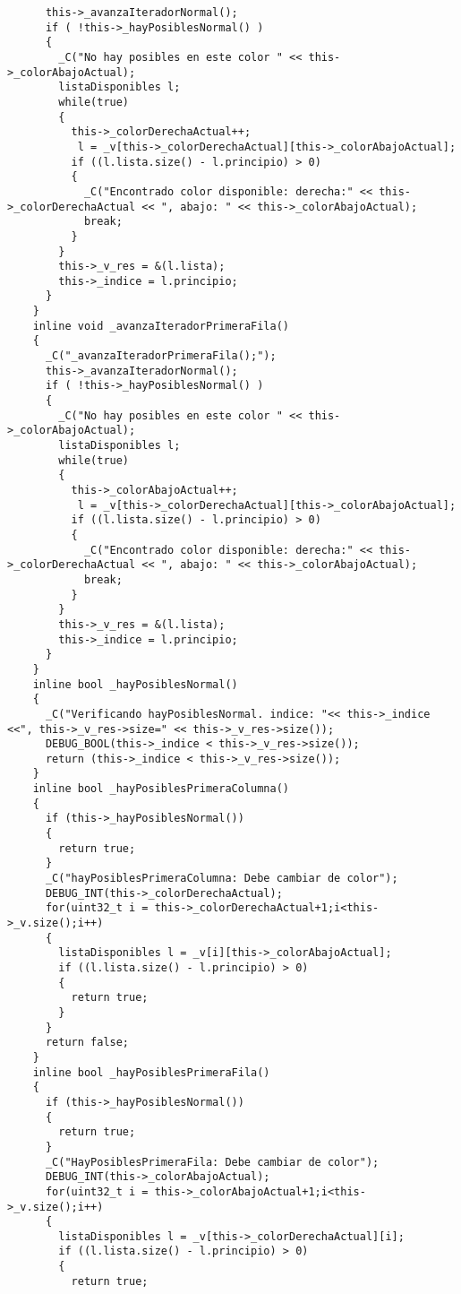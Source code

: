 \documentclass[11pt, a4paper, twoside]{article}
\begin{document}
\begin{lstlisting}
      this->_avanzaIteradorNormal();
      if ( !this->_hayPosiblesNormal() )
      {
        _C("No hay posibles en este color " << this->_colorAbajoActual);
        listaDisponibles l;
        while(true)
        {
          this->_colorDerechaActual++;
           l = _v[this->_colorDerechaActual][this->_colorAbajoActual];
          if ((l.lista.size() - l.principio) > 0)
          {
            _C("Encontrado color disponible: derecha:" << this->_colorDerechaActual << ", abajo: " << this->_colorAbajoActual);
            break;
          }
        }
        this->_v_res = &(l.lista);
        this->_indice = l.principio;
      }
    }
    inline void _avanzaIteradorPrimeraFila()
    {
      _C("_avanzaIteradorPrimeraFila();");
      this->_avanzaIteradorNormal();
      if ( !this->_hayPosiblesNormal() )
      {
        _C("No hay posibles en este color " << this->_colorAbajoActual);
        listaDisponibles l;
        while(true)
        {
          this->_colorAbajoActual++;
           l = _v[this->_colorDerechaActual][this->_colorAbajoActual];
          if ((l.lista.size() - l.principio) > 0)
          {
            _C("Encontrado color disponible: derecha:" << this->_colorDerechaActual << ", abajo: " << this->_colorAbajoActual);
            break;
          }
        }
        this->_v_res = &(l.lista);
        this->_indice = l.principio;
      }
    }
    inline bool _hayPosiblesNormal() 
    {
      _C("Verificando hayPosiblesNormal. indice: "<< this->_indice <<", this->_v_res->size=" << this->_v_res->size());
      DEBUG_BOOL(this->_indice < this->_v_res->size());
      return (this->_indice < this->_v_res->size());
    }
    inline bool _hayPosiblesPrimeraColumna() 
    {
      if (this->_hayPosiblesNormal())
      {
        return true;
      }
      _C("hayPosiblesPrimeraColumna: Debe cambiar de color");
      DEBUG_INT(this->_colorDerechaActual);
      for(uint32_t i = this->_colorDerechaActual+1;i<this->_v.size();i++)
      {
        listaDisponibles l = _v[i][this->_colorAbajoActual];
        if ((l.lista.size() - l.principio) > 0)
        {
          return true;
        }
      }
      return false;
    }
    inline bool _hayPosiblesPrimeraFila() 
    {
      if (this->_hayPosiblesNormal())
      {
        return true;
      }
      _C("HayPosiblesPrimeraFila: Debe cambiar de color");
      DEBUG_INT(this->_colorAbajoActual);
      for(uint32_t i = this->_colorAbajoActual+1;i<this->_v.size();i++)
      {
        listaDisponibles l = _v[this->_colorDerechaActual][i];
        if ((l.lista.size() - l.principio) > 0)
        {
          return true;

\end{lstlisting}
\end{document}
